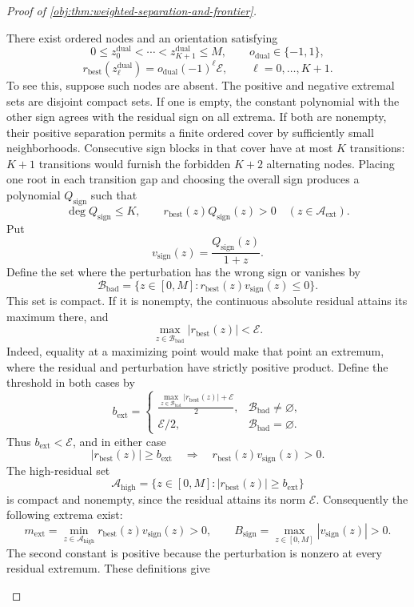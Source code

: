 \documentclass[11pt]{article}
\begin{document}
\begin{proof}[Proof of \cref{obj:thm:weighted-separation-and-frontier}]
\begin{enumerate}
There exist ordered nodes and an orientation satisfying
\[
0\le z_0^{\mathrm{dual}}<\cdots<z_{K+1}^{\mathrm{dual}}\le M,
\qquad
o_{\mathrm{dual}}\in\{-1,1\},
\]
\[
r_{\mathrm{best}}(z_\ell^{\mathrm{dual}})
=o_{\mathrm{dual}}(-1)^\ell\mathcal E,
\qquad \ell=0,\ldots,K+1.
\]
To see this, suppose such nodes are absent. The positive and negative extremal sets are disjoint compact sets. If one is empty, the constant polynomial with the other sign agrees with the residual sign on all extrema. If both are nonempty, their positive separation permits a finite ordered cover by sufficiently small neighborhoods. Consecutive sign blocks in that cover have at most \(K\) transitions: \(K+1\) transitions would furnish the forbidden \(K+2\) alternating nodes. Placing one root in each transition gap and choosing the overall sign produces a polynomial \(Q_{\mathrm{sign}}\) such that
\[
\deg Q_{\mathrm{sign}}\le K,
\qquad
r_{\mathrm{best}}(z)Q_{\mathrm{sign}}(z)>0
\quad(z\in\mathcal A_{\mathrm{ext}}).
\]
Put
\[
v_{\mathrm{sign}}(z)=\frac{Q_{\mathrm{sign}}(z)}{1+z}.
\]
Define the set where the perturbation has the wrong sign or vanishes by
\[
\mathcal B_{\mathrm{bad}}
=\{z\in[0,M]:r_{\mathrm{best}}(z)v_{\mathrm{sign}}(z)\le0\}.
\]
This set is compact. If it is nonempty, the continuous absolute residual attains its maximum there, and
\[
\max_{z\in\mathcal B_{\mathrm{bad}}}|r_{\mathrm{best}}(z)|<\mathcal E.
\]
Indeed, equality at a maximizing point would make that point an extremum, where the residual and perturbation have strictly positive product. Define the threshold in both cases by
\[
b_{\mathrm{ext}}=
\begin{cases}
\displaystyle\frac{\max_{z\in\mathcal B_{\mathrm{bad}}}|r_{\mathrm{best}}(z)|+\mathcal E}{2},
&\mathcal B_{\mathrm{bad}}\ne\varnothing,\\[6pt]
\mathcal E/2,&\mathcal B_{\mathrm{bad}}=\varnothing.
\end{cases}
\]
Thus \(b_{\mathrm{ext}}<\mathcal E\), and in either case
\[
|r_{\mathrm{best}}(z)|\ge b_{\mathrm{ext}}
\quad\Longrightarrow\quad
r_{\mathrm{best}}(z)v_{\mathrm{sign}}(z)>0.
\]
The high-residual set
\[
\mathcal A_{\mathrm{high}}
=\{z\in[0,M]:|r_{\mathrm{best}}(z)|\ge b_{\mathrm{ext}}\}
\]
is compact and nonempty, since the residual attains its norm \(\mathcal E\). Consequently the following extrema exist:
\[
m_{\mathrm{ext}}
=\min_{z\in\mathcal A_{\mathrm{high}}}
 r_{\mathrm{best}}(z)v_{\mathrm{sign}}(z)>0,
\qquad
B_{\mathrm{sign}}
=\max_{z\in[0,M]}|v_{\mathrm{sign}}(z)|>0.
\]
The second constant is positive because the perturbation is nonzero at every residual extremum. These definitions give

\end{enumerate}
\end{proof}
\end{document}
